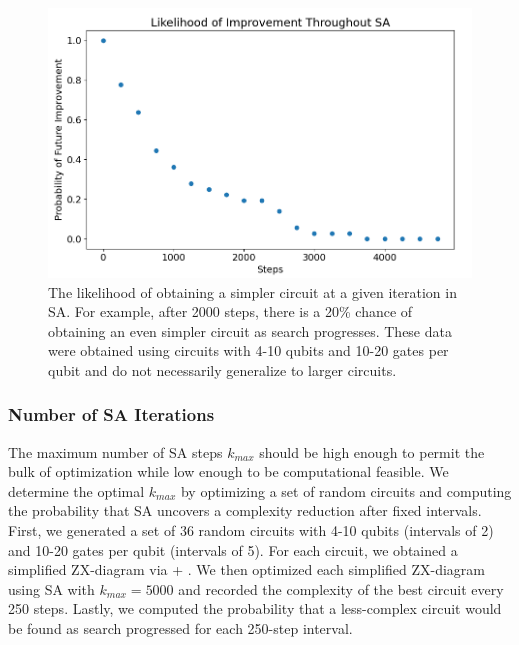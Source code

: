 \begin{figure}[t]
\centering
\includegraphics[width=13cm]{img/iter-likelihood.png}
\caption{
  The likelihood of obtaining a simpler circuit at a given iteration in SA.
  For example, after 2000 steps, there is a 20\% chance of obtaining an even simpler circuit as search progresses.
  These data were obtained using circuits with 4-10 qubits and 10-20 gates per qubit and do not necessarily generalize to larger circuits.
}
\label{fig:iter-likelihood}
\end{figure}

\subsubsection*{Number of SA Iterations}

The maximum number of SA steps $k_{max}$ should be high enough to permit the bulk of optimization while low enough to be computational feasible.
We determine the optimal $k_{max}$ by optimizing a set of random circuits and computing the probability that SA uncovers a complexity reduction after fixed intervals.
First, we generated a set of 36 random circuits with 4-10 qubits (intervals of 2) and 10-20 gates per qubit (intervals of 5).
For each circuit, we obtained a simplified ZX-diagram via  + .
We then optimized each simplified ZX-diagram using SA with $k_{max} = 5000$ and recorded the complexity of the best circuit every 250 steps.
Lastly, we computed the probability that a less-complex circuit would be found as search progressed for each 250-step interval.

